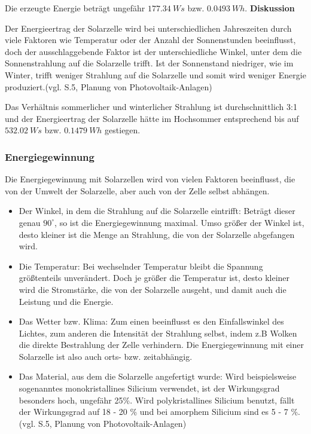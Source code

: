         Die erzeugte Energie beträgt ungefähr $177.34\ Ws$ bzw. $0.0493\ Wh$.
        \vspace{4mm}
        \newline
        \textbf{Diskussion}
        \newline
        \par Der Energieertrag der Solarzelle wird bei unterschiedlichen Jahreszeiten durch viele Faktoren wie Temperatur oder der Anzahl der Sonnenstunden beeinflusst, doch der ausschlaggebende Faktor ist der unterschiedliche Winkel, unter dem die Sonnenstrahlung auf die Solarzelle trifft. Ist der Sonnenstand niedriger, wie im Winter, trifft weniger Strahlung auf die Solarzelle und somit wird weniger Energie produziert.(vgl. S.5, Planung von Photovoltaik-Anlagen)
        \par Das Verhältnis sommerlicher und winterlicher Strahlung ist durchschnittlich 3:1 %
        und der Energieertrag der Solarzelle hätte im Hochsommer entsprechend bis auf $532.02\ Ws$ bzw. $0.1479\ Wh$ gestiegen.
        
    \subsubsection{Energiegewinnung}                                    %
        \par Die Energiegewinnung mit Solarzellen wird von vielen Faktoren beeinflusst, die von der Umwelt der Solarzelle, aber auch von der Zelle selbst abhängen.
        \begin{itemize}
            \item Der Winkel, in dem die Strahlung auf die Solarzelle eintrifft: Beträgt dieser genau $90^{\circ}$, so ist die Energiegewinnung maximal. Umso größer der Winkel ist, desto kleiner ist die Menge an Strahlung, die von der Solarzelle abgefangen wird.
            \item Die Temperatur: Bei wechselnder Temperatur bleibt die Spannung größtenteils unverändert. Doch je größer die Temperatur ist, desto kleiner wird die Stromstärke, die von der Solarzelle ausgeht, und damit auch die Leistung und die Energie.
            \item Das Wetter bzw. Klima: Zum einen beeinflusst es den Einfallswinkel des Lichtes, zum anderen die Intensität der Strahlung selbst, indem z.B Wolken die direkte Bestrahlung der Zelle verhindern. Die Energiegewinnung mit einer Solarzelle ist also auch orts- bzw. zeitabhängig.
            \item Das Material, aus dem die Solarzelle angefertigt wurde: Wird beispielsweise sogenanntes monokristallines Silicium verwendet, ist der Wirkungsgrad besonders hoch, ungefähr 25\%. Wird polykristallines Silicium benutzt, fällt der Wirkungsgrad auf 18 - 20 \% und bei amorphem Silicium sind es 5 - 7 \%. (vgl. S.5, Planung von Photovoltaik-Anlagen)
        \end{itemize}
